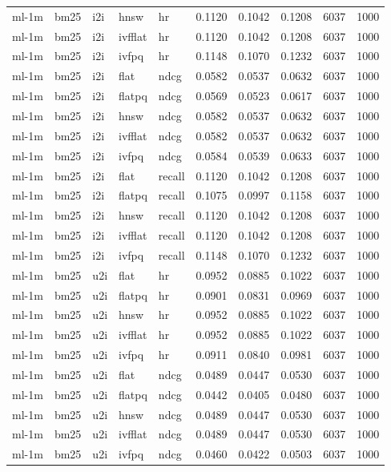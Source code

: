 \begin{tabular}{lllllrrrrr}
ml-1m & bm25 & i2i & hnsw & hr & 0.1120 & 0.1042 & 0.1208 & 6037 & 1000 \\
ml-1m & bm25 & i2i & ivfflat & hr & 0.1120 & 0.1042 & 0.1208 & 6037 & 1000 \\
ml-1m & bm25 & i2i & ivfpq & hr & 0.1148 & 0.1070 & 0.1232 & 6037 & 1000 \\
ml-1m & bm25 & i2i & flat & ndcg & 0.0582 & 0.0537 & 0.0632 & 6037 & 1000 \\
ml-1m & bm25 & i2i & flatpq & ndcg & 0.0569 & 0.0523 & 0.0617 & 6037 & 1000 \\
ml-1m & bm25 & i2i & hnsw & ndcg & 0.0582 & 0.0537 & 0.0632 & 6037 & 1000 \\
ml-1m & bm25 & i2i & ivfflat & ndcg & 0.0582 & 0.0537 & 0.0632 & 6037 & 1000 \\
ml-1m & bm25 & i2i & ivfpq & ndcg & 0.0584 & 0.0539 & 0.0633 & 6037 & 1000 \\
ml-1m & bm25 & i2i & flat & recall & 0.1120 & 0.1042 & 0.1208 & 6037 & 1000 \\
ml-1m & bm25 & i2i & flatpq & recall & 0.1075 & 0.0997 & 0.1158 & 6037 & 1000 \\
ml-1m & bm25 & i2i & hnsw & recall & 0.1120 & 0.1042 & 0.1208 & 6037 & 1000 \\
ml-1m & bm25 & i2i & ivfflat & recall & 0.1120 & 0.1042 & 0.1208 & 6037 & 1000 \\
ml-1m & bm25 & i2i & ivfpq & recall & 0.1148 & 0.1070 & 0.1232 & 6037 & 1000 \\
ml-1m & bm25 & u2i & flat & hr & 0.0952 & 0.0885 & 0.1022 & 6037 & 1000 \\
ml-1m & bm25 & u2i & flatpq & hr & 0.0901 & 0.0831 & 0.0969 & 6037 & 1000 \\
ml-1m & bm25 & u2i & hnsw & hr & 0.0952 & 0.0885 & 0.1022 & 6037 & 1000 \\
ml-1m & bm25 & u2i & ivfflat & hr & 0.0952 & 0.0885 & 0.1022 & 6037 & 1000 \\
ml-1m & bm25 & u2i & ivfpq & hr & 0.0911 & 0.0840 & 0.0981 & 6037 & 1000 \\
ml-1m & bm25 & u2i & flat & ndcg & 0.0489 & 0.0447 & 0.0530 & 6037 & 1000 \\
ml-1m & bm25 & u2i & flatpq & ndcg & 0.0442 & 0.0405 & 0.0480 & 6037 & 1000 \\
ml-1m & bm25 & u2i & hnsw & ndcg & 0.0489 & 0.0447 & 0.0530 & 6037 & 1000 \\
ml-1m & bm25 & u2i & ivfflat & ndcg & 0.0489 & 0.0447 & 0.0530 & 6037 & 1000 \\
ml-1m & bm25 & u2i & ivfpq & ndcg & 0.0460 & 0.0422 & 0.0503 & 6037 & 1000 \\

\end{tabular}
